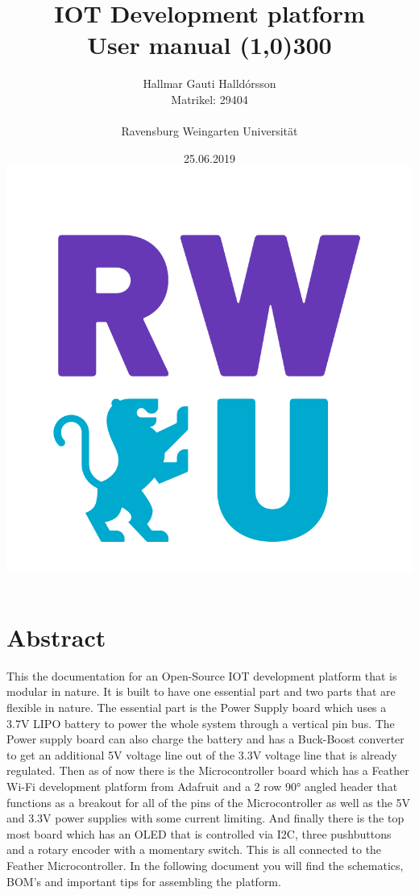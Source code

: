 \documentclass{article}
\begin{document}
	\begin{titlepage}
		\centering
		\title{IOT Development platform \\ User manual \line(1,0){300}}
		\date{25.06.2019 \\ \includegraphics[width=0.1\linewidth]{HS_Weingarten} \\  }
		\author{\Large Hallmar Gauti Halldórsson\\ {Matrikel: 29404} \\ 
		\\ \Large Ravensburg Weingarten Universität } %
	\end{titlepage}
	\maketitle
	\newpage
	\tableofcontents
	\newpage

\section{Abstract}
This the documentation for an Open-Source IOT development platform that is modular in nature. It is built to have one essential part and two parts that are flexible in nature. The essential part is the Power Supply board which uses a 3.7V LIPO battery to power the whole system through a vertical pin bus. 
The Power supply board can also charge the battery and has a Buck-Boost converter to get an additional 5V voltage line out of the 3.3V voltage line that is already regulated. 
\newline\newline
Then as of now there is the Microcontroller board which has a Feather Wi-Fi development platform from Adafruit and a 2 row 90° angled header that functions as a breakout for all of the pins of the Microcontroller as well as the 5V and 3.3V power supplies with some current limiting. 
\newline\newline
And finally there is the top most board which has an OLED that is controlled via I2C, three pushbuttons and a rotary encoder with a momentary switch. This is all connected to the Feather Microcontroller. 
\newline\newline
In the following document you will find the schematics, BOM's and important tips for assembling the platform. 
\end{document}
